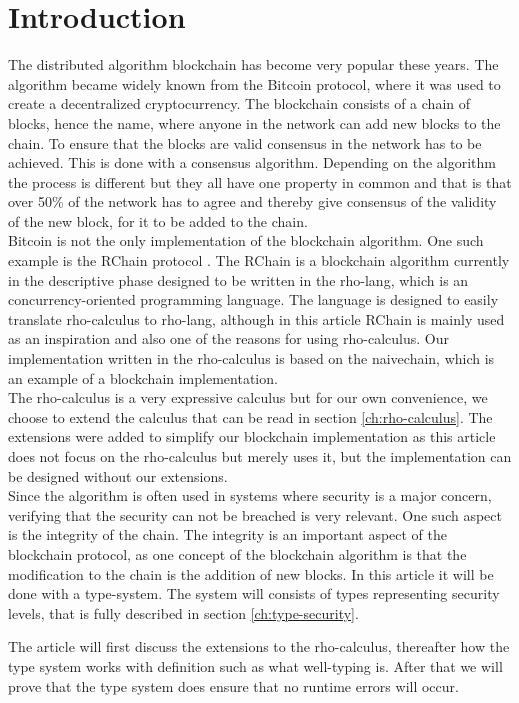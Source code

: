 \section{Introduction}
The distributed algorithm blockchain has become very popular these years. The algorithm became widely known from the Bitcoin protocol, where it was used to create a decentralized cryptocurrency\citep{website:blockchain}. The blockchain consists of a chain of blocks, hence the name, where anyone in the network can add new blocks to the chain. To ensure that the blocks are valid consensus in the network has to be achieved. This is done with a consensus algorithm. Depending on the algorithm the process is different but they all have one property in common and that is that over 50\% of the network has to agree and thereby give consensus of the validity of the new block, for it to be added to the chain.\\
Bitcoin is not the only implementation of the blockchain algorithm. One such example is the RChain protocol \citep{website:RChain}. The RChain is a blockchain algorithm currently in the descriptive phase designed to be written in the rho-lang, which is an concurrency-oriented programming language. The language is designed to easily translate rho-calculus to rho-lang\citep{website:rho-lang}, although in this article RChain is mainly used as an inspiration and also one of the reasons for using rho-calculus. Our implementation written in the rho-calculus is based on the naivechain, which is an example of a blockchain implementation\citep{naivechain}.\\

The rho-calculus is a very expressive calculus but for our own convenience, we choose to extend the calculus that can be read in section \ref{ch:rho-calculus}. The extensions were added to simplify our blockchain implementation as this article does not focus on the rho-calculus but merely uses it, but the implementation can be designed without our extensions.\\

Since the algorithm is often used in systems where security is a major concern, verifying that the security can not be breached is very relevant. One such aspect is the integrity of the chain.
The integrity is an important aspect of the blockchain protocol, as one concept of the blockchain algorithm is that the modification to the chain is the addition of new blocks. In this article it will be done with a type-system. The system will consists of types representing security levels, that is fully described in section \ref{ch:type-security}.

The article will first discuss the extensions to the rho-calculus, thereafter how the type system works with definition such as what well-typing is. After that we will prove that the type system does ensure that no runtime errors will occur.
